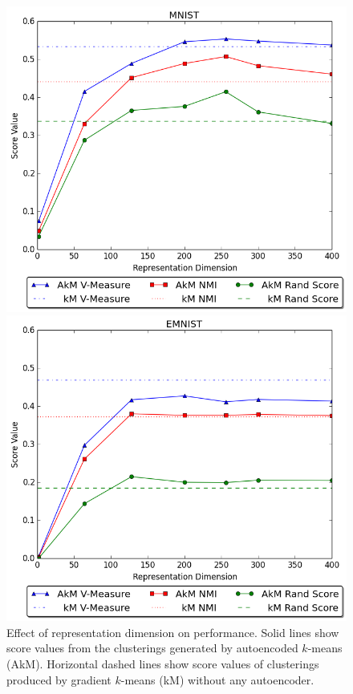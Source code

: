 \begin{figure}
	\centering
	\begin{minipage}[b]{0.45\textwidth}
		\includegraphics[width=\textwidth]{figs/mnist_graph.png}
	\end{minipage}
	\hfill
	\begin{minipage}[b]{0.45\textwidth}
		\includegraphics[width=\textwidth]{figs/emnist_graph.png}
	\end{minipage}
	\caption{Effect of representation dimension on performance. Solid lines show score values from the clusterings generated by autoencoded $k$-means (AkM). Horizontal dashed lines show score values of clusterings produced by gradient $k$-means (kM) without any autoencoder.}
	\label{fig:dims}
\end{figure}

